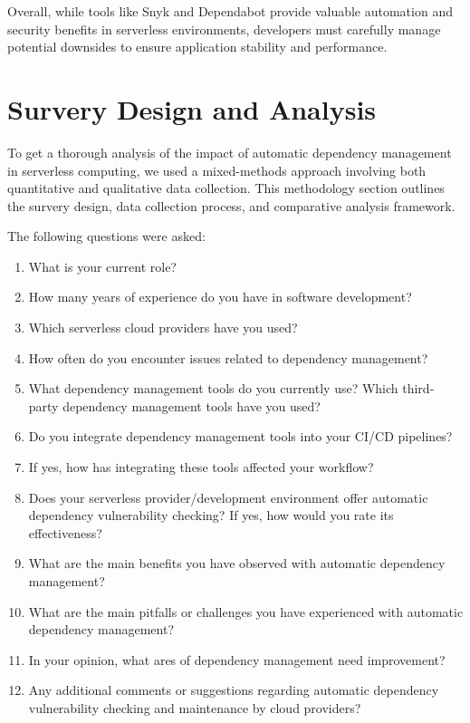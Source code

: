 \documentclass[sigconf]{acmart}
\begin{document}
Overall, while tools like Snyk and Dependabot provide valuable automation and security benefits in serverless environments, developers must carefully manage potential downsides to ensure application stability and performance.

\section{Survery Design and Analysis}

To get a thorough analysis of the impact of automatic dependency management in serverless computing, we used a mixed-methods approach involving both quantitative and qualitative data collection. This methodology section outlines the survery design, data collection process, and comparative analysis framework.

The following questions were asked:

\begin{enumerate}
	\item What is your current role?
	\item How many years of experience do you have in software development?
	\item Which serverless cloud providers have you used?
	\item How often do you encounter issues related to dependency management?
	\item What dependency management tools do you currently use? Which third-party dependency management tools have you used?
	\item Do you integrate dependency management tools into your CI/CD pipelines?
	\item If yes, how has integrating these tools affected your workflow?
	\item Does your serverless provider/development environment offer automatic dependency vulnerability checking? If yes, how would you rate its effectiveness?
	\item What are the main benefits you have observed with automatic dependency management?
	\item What are the main pitfalls or challenges you have experienced with automatic dependency management?
	\item In your opinion, what ares of dependency management need improvement?
	\item Any additional comments or suggestions regarding automatic dependency vulnerability checking and maintenance by cloud providers?
\end{enumerate}
\end{document}
